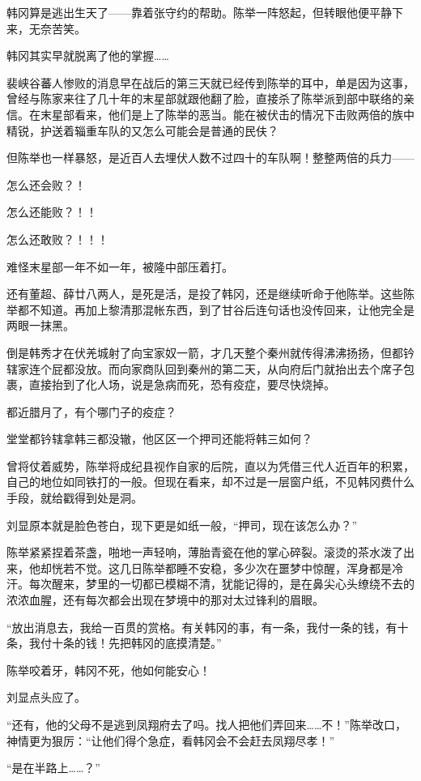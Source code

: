 韩冈算是逃出生天了——靠着张守约的帮助。陈举一阵怒起，但转眼他便平静下来，无奈苦笑。

韩冈其实早就脱离了他的掌握……

裴峡谷蕃人惨败的消息早在战后的第三天就已经传到陈举的耳中，单是因为这事，曾经与陈家来往了几十年的末星部就跟他翻了脸，直接杀了陈举派到部中联络的亲信。在末星部看来，他们是上了陈举的恶当。能在被伏击的情况下击败两倍的族中精锐，护送着辎重车队的又怎么可能会是普通的民伕？

但陈举也一样暴怒，是近百人去埋伏人数不过四十的车队啊！整整两倍的兵力——

怎么还会败？！

怎么还能败？！！

怎么还敢败？！！！

难怪末星部一年不如一年，被隆中部压着打。

还有董超、薛廿八两人，是死是活，是投了韩冈，还是继续听命于他陈举。这些陈举都不知道。再加上黎清那混帐东西，到了甘谷后连句话也没传回来，让他完全是两眼一抹黑。

倒是韩秀才在伏羌城射了向宝家奴一箭，才几天整个秦州就传得沸沸扬扬，但都钤辖家连个屁都没放。而向家商队回到秦州的第二天，从向府后门就抬出去个席子包裹，直接抬到了化人场，说是急病而死，恐有疫症，要尽快烧掉。

都近腊月了，有个哪门子的疫症？

堂堂都钤辖拿韩三都没辙，他区区一个押司还能将韩三如何？

曾将仗着威势，陈举将成纪县视作自家的后院，直以为凭借三代人近百年的积累，自己的地位如同铁打的一般。但现在看来，却不过是一层窗户纸，不见韩冈费什么手段，就给戳得到处是洞。

刘显原本就是脸色苍白，现下更是如纸一般，“押司，现在该怎么办？”

陈举紧紧捏着茶盏，啪地一声轻响，薄胎青瓷在他的掌心碎裂。滚烫的茶水泼了出来，他却恍若不觉。这几日陈举都睡不安稳，多少次在噩梦中惊醒，浑身都是冷汗。每次醒来，梦里的一切都已模糊不清，犹能记得的，是在鼻尖心头缭绕不去的浓浓血腥，还有每次都会出现在梦境中的那对太过锋利的眉眼。

“放出消息去，我给一百贯的赏格。有关韩冈的事，有一条，我付一条的钱，有十条，我付十条的钱！先把韩冈的底摸清楚。”

陈举咬着牙，韩冈不死，他如何能安心！

刘显点头应了。

“还有，他的父母不是逃到凤翔府去了吗。找人把他们弄回来……不！”陈举改口，神情更为狠厉：“让他们得个急症，看韩冈会不会赶去凤翔尽孝！”

“是在半路上……？”


